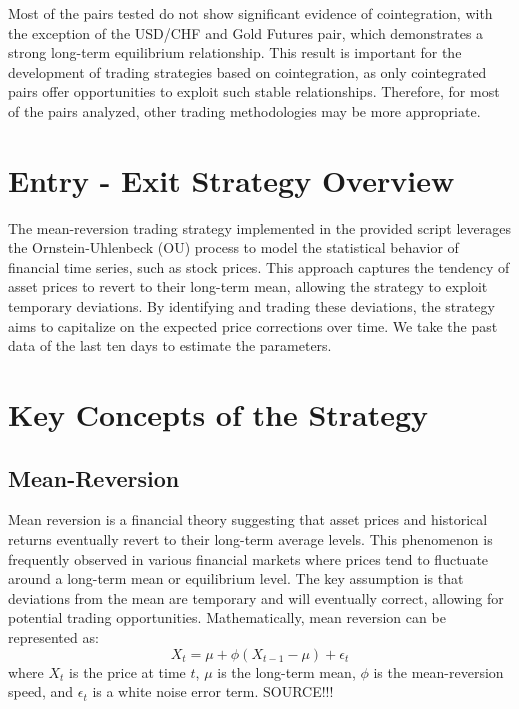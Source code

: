 \documentclass{article}
\begin{document}
Most of the pairs tested do not show significant evidence of cointegration, with the exception of the USD/CHF and Gold Futures pair, which demonstrates a strong long-term equilibrium relationship. This result is important for the development of trading strategies based on cointegration, as only cointegrated pairs offer opportunities to exploit such stable relationships. Therefore, for most of the pairs analyzed, other trading methodologies may be more appropriate.

\clearpage



















\section{Entry - Exit Strategy Overview}
The mean-reversion trading strategy implemented in the provided script leverages the Ornstein-Uhlenbeck (OU) process to model the statistical behavior of financial time series, such as stock prices. This approach captures the tendency of asset prices to revert to their long-term mean, allowing the strategy to exploit temporary deviations. By identifying and trading these deviations, the strategy aims to capitalize on the expected price corrections over time.
We take the past data of the last ten days to estimate the parameters.

\section*{Key Concepts of the Strategy}
\subsection*{Mean-Reversion}
Mean reversion is a financial theory suggesting that asset prices and historical returns eventually revert to their long-term average levels. This phenomenon is frequently observed in various financial markets where prices tend to fluctuate around a long-term mean or equilibrium level. The key assumption is that deviations from the mean are temporary and will eventually correct, allowing for potential trading opportunities. Mathematically, mean reversion can be represented as:
\begin{equation}
X_t = \mu + \phi (X_{t-1} - \mu) + \epsilon_t
\end{equation}
where \( X_t \) is the price at time \( t \), \( \mu \) is the long-term mean, \( \phi \) is the mean-reversion speed, and \( \epsilon_t \) is a white noise error term.
SOURCE!!!
\end{document}
